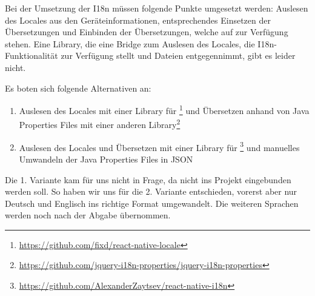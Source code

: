 Bei der Umsetzung der I18n müssen folgende Punkte umgesetzt werden: Auslesen des Locales aus den Geräteinformationen, entsprechendes Einsetzen der Übersetzungen und Einbinden der Übersetzungen, welche auf  zur Verfügung stehen.
Eine \gls{Library}, die eine  Bridge zum Auslesen des Locales, die I18n-Funktionalität zur Verfügung stellt und  Dateien entgegennimmt, gibt es leider nicht.

Es boten sich folgende Alternativen an:
\begin{enumerate}
\item Auslesen des Locales mit einer Library für \footnote{\url{https://github.com/fixd/react-native-locale}} und Übersetzen anhand von Java Properties Files mit einer anderen Library\footnote{\url{https://github.com/jquery-i18n-properties/jquery-i18n-properties}}
\item Auslesen des Locales und Übersetzen mit einer Library für \footnote{\url{https://github.com/AlexanderZaytsev/react-native-i18n}} und manuelles Umwandeln der Java Properties Files in JSON
\end{enumerate}

Die 1. Variante kam für uns nicht in Frage, da  nicht ins Projekt eingebunden werden soll.
So haben wir uns für die 2. Variante entschieden, vorerst aber nur Deutsch und Englisch ins richtige Format umgewandelt.
Die weiteren Sprachen werden noch nach der Abgabe übernommen.
